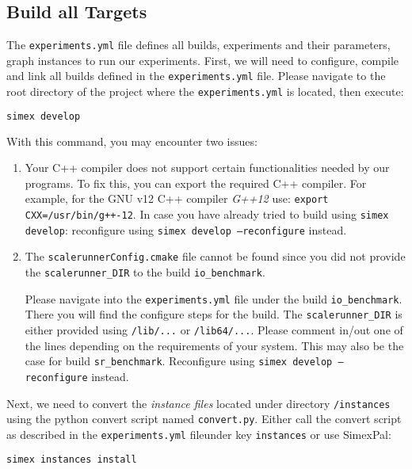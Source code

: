 \documentclass[11pt, a4paper]{scrartcl}
\newcommand{\expfile}{\texttt{experiments.yml} file}
\begin{document}
\subsection{Build all Targets}

The \texttt{experiments.yml} file defines all builds, experiments and their
parameters, graph instances to run our experiments. First, we will need to
configure, compile and link all builds defined in the \expfile. Please navigate
to the root directory of the project where the \texttt{experiments.yml} is
located, then execute:

\begin{lstlisting}[language=bash]
simex develop
\end{lstlisting}

With this command, you may encounter two issues:

\begin{enumerate}
    \item Your C++ compiler does not support certain functionalities needed by
    our programs. To fix this, you can export the required C++ compiler. For
    example, for the GNU v12 C++ compiler \textit{G++12} use: \texttt{export
    CXX=/usr/bin/g++-12}. In case you have already tried to build using
    \texttt{simex develop}: reconfigure using \texttt{simex develop
    --reconfigure} instead.
    \item The \texttt{scalerunnerConfig.cmake} file cannot be found since you
       did not provide the \texttt{scalerunner\_DIR} to the build \texttt{io\_benchmark}.
       
       Please navigate into the \texttt{experiments.yml} file under the build
       \texttt{io\_benchmark}. There you will find the configure steps for the build.
       The \texttt{scalerunner\_DIR} is either provided using \texttt{/lib/...} or
       \texttt{/lib64/...}. Please comment in/out one of the lines depending on the
       requirements of your system. This may also be the case for build
       \texttt{sr\_benchmark}. Reconfigure using \texttt{simex develop --reconfigure} instead.
\end{enumerate}

Next, we need to convert the \textit{instance files} located under directory
\texttt{/instances} using the python convert script named \texttt{convert.py}.
Either call the convert script as described in the \expfile under key
\texttt{instances} or use SimexPal:

\begin{lstlisting}[language=bash]
simex instances install
\end{lstlisting}
\end{document}
